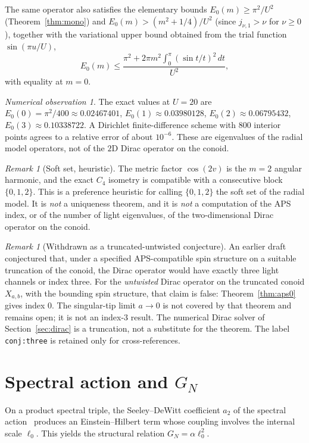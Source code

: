 \documentclass[11pt,a4paper]{article}
\theoremstyle{definition}
\theoremstyle{remark}
\newtheorem{remark}[theorem]{Remark}
\newtheorem{numobs}[theorem]{Numerical observation}
\begin{document}
The same operator also satisfies the elementary bounds
$E_0(m)\ge\pi^2/U^2$ (Theorem~\ref{thm:mono}) and
$E_0(m)>(m^2+1/4)/U^2$ (since $j_{\nu,1}>\nu$ for $\nu\ge 0$), together
with the variational upper bound obtained from the trial function
$\sin(\pi u/U)$,
\[
  E_0(m)\le \frac{\pi^2+2\pi m^2\int_0^\pi(\sin t/t)^2\,dt}{U^2},
\]
with equality at $m=0$.

\begin{numobs}
The exact values at $U=20$ are
$E_0(0)=\pi^2/400\approx 0.02467401$,
$E_0(1)\approx 0.03980128$,
$E_0(2)\approx 0.06795432$,
$E_0(3)\approx 0.10338722$.
A Dirichlet finite-difference scheme with $800$ interior points agrees
to a relative error of about $10^{-6}$. These are eigenvalues of the
radial model operators, not of the $2$D Dirac operator on the conoid.
\end{numobs}

\begin{remark}[Soft set, heuristic]
The metric factor $\cos(2v)$ is the $m=2$ angular harmonic, and the
exact $C_4$ isometry is compatible with a consecutive block
$\{0,1,2\}$. This is a preference heuristic for calling $\{0,1,2\}$ the
soft set of the radial model. It is \emph{not} a uniqueness theorem, and
it is \emph{not} a computation of the APS index, or of the number of
light eigenvalues, of the two-dimensional Dirac operator on the conoid.
\end{remark}

\begin{remark}[Withdrawn as a truncated-untwisted conjecture]
\label{conj:three}
An earlier draft conjectured that, under a specified APS-compatible
spin structure on a suitable truncation of the conoid, the Dirac
operator would have exactly three light channels or index three.
For the \emph{untwisted} Dirac operator on the truncated conoid
$X_{a,b}$, with the bounding spin structure, that claim is false:
Theorem~\ref{thm:aps0} gives index $0$. The singular-tip limit
$a\to 0$ is not covered by that theorem and remains open; it is not
an index-$3$ result. The numerical Dirac solver of
Section~\ref{sec:dirac} is a truncation, not a substitute for the
theorem. The label \texttt{conj:three} is retained only for
cross-references.
\end{remark}

\section{Spectral action and $G_N$}

On a product spectral triple, the Seeley--DeWitt coefficient $a_2$ of
the spectral action~\cite{ChamseddineConnes} produces an
Einstein--Hilbert term whose coupling involves the internal scale
$\ell_0$. This yields the structural relation $G_N=\alpha\ell_0^2$.
\end{document}
